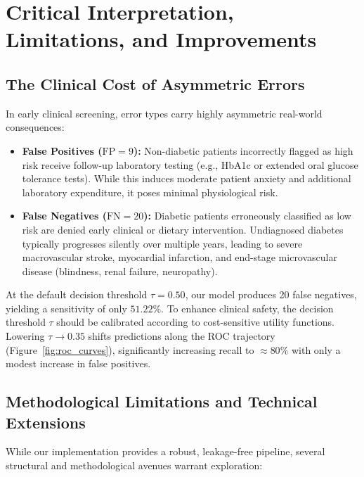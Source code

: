\documentclass[11pt,a4paper]{article}
\begin{document}
\section{Critical Interpretation, Limitations, and Improvements}
\label{sec:discussion}

\subsection{The Clinical Cost of Asymmetric Errors}
In early clinical screening, error types carry highly asymmetric real-world consequences:
\begin{itemize}[leftmargin=*]
    \item \textbf{False Positives ($\text{FP} = 9$):} Non-diabetic patients incorrectly flagged as high risk receive follow-up laboratory testing (e.g., HbA1c or extended oral glucose tolerance tests). While this induces moderate patient anxiety and additional laboratory expenditure, it poses minimal physiological risk.
    \item \textbf{False Negatives ($\text{FN} = 20$):} Diabetic patients erroneously classified as low risk are denied early clinical or dietary intervention. Undiagnosed diabetes typically progresses silently over multiple years, leading to severe macrovascular stroke, myocardial infarction, and end-stage microvascular disease (blindness, renal failure, neuropathy).
\end{itemize}

At the default decision threshold $\tau = 0.50$, our model produces 20 false negatives, yielding a sensitivity of only $51.22\%$. To enhance clinical safety, the decision threshold $\tau$ should be calibrated according to cost-sensitive utility functions. Lowering $\tau \to 0.35$ shifts predictions along the ROC trajectory (Figure~\ref{fig:roc_curves}), significantly increasing recall to $\approx 80\%$ with only a modest increase in false positives.

\subsection{Methodological Limitations and Technical Extensions}
While our implementation provides a robust, leakage-free pipeline, several structural and methodological avenues warrant exploration:
\end{document}
